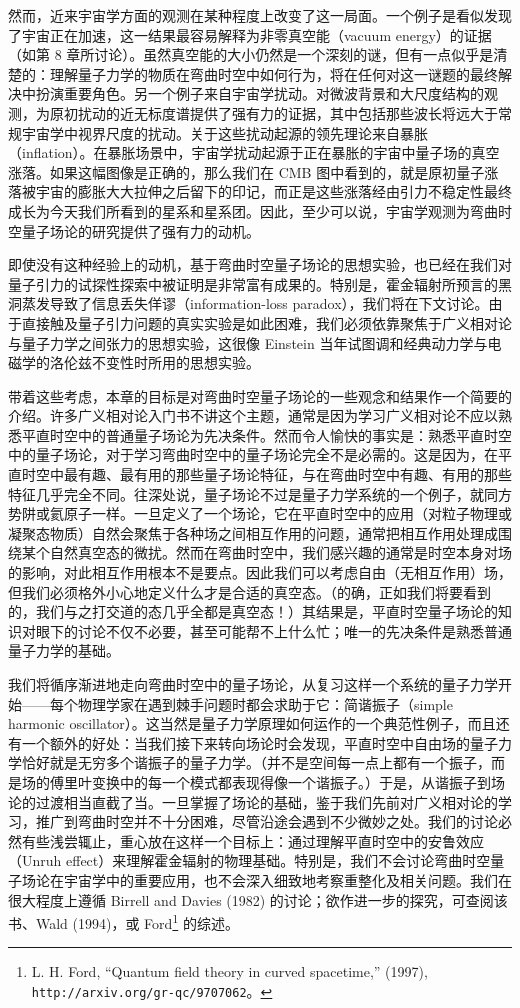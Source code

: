 然而，近来宇宙学方面的观测在某种程度上改变了这一局面。一个例子是看似发现了宇宙正在加速，这一结果最容易解释为非零真空能（vacuum energy）的证据（如第 8 章所讨论）。虽然真空能的大小仍然是一个深刻的谜，但有一点似乎是清楚的：理解量子力学的物质在弯曲时空中如何行为，将在任何对这一谜题的最终解决中扮演重要角色。另一个例子来自宇宙学扰动。对微波背景和大尺度结构的观测，为原初扰动的近无标度谱提供了强有力的证据，其中包括那些波长将远大于常规宇宙学中视界尺度的扰动。关于这些扰动起源的领先理论来自暴胀（inflation）。在暴胀场景中，宇宙学扰动起源于正在暴胀的宇宙中量子场的真空涨落。如果这幅图像是正确的，那么我们在 CMB 图中看到的，就是原初量子涨落被宇宙的膨胀大大拉伸之后留下的印记，而正是这些涨落经由引力不稳定性最终成长为今天我们所看到的星系和星系团。因此，至少可以说，宇宙学观测为弯曲时空量子场论的研究提供了强有力的动机。

即使没有这种经验上的动机，基于弯曲时空量子场论的思想实验，也已经在我们对量子引力的试探性探索中被证明是非常富有成果的。特别是，霍金辐射所预言的黑洞蒸发导致了信息丢失佯谬（information-loss paradox），我们将在下文讨论。由于直接触及量子引力问题的真实实验是如此困难，我们必须依靠聚焦于广义相对论与量子力学之间张力的思想实验，这很像 Einstein 当年试图调和经典动力学与电磁学的洛伦兹不变性时所用的思想实验。

带着这些考虑，本章的目标是对弯曲时空量子场论的一些观念和结果作一个简要的介绍。许多广义相对论入门书不讲这个主题，通常是因为学习广义相对论不应以熟悉平直时空中的普通量子场论为先决条件。然而令人愉快的事实是：熟悉平直时空中的量子场论，对于学习弯曲时空中的量子场论完全不是必需的。这是因为，在平直时空中最有趣、最有用的那些量子场论特征，与在弯曲时空中有趣、有用的那些特征几乎完全不同。往深处说，量子场论不过是量子力学系统的一个例子，就同方势阱或氦原子一样。一旦定义了一个场论，它在平直时空中的应用（对粒子物理或凝聚态物质）自然会聚焦于各种场之间相互作用的问题，通常把相互作用处理成围绕某个自然真空态的微扰。然而在弯曲时空中，我们感兴趣的通常是时空本身对场的影响，对此相互作用根本不是要点。因此我们可以考虑自由（无相互作用）场，但我们必须格外小心地定义什么才是合适的真空态。（的确，正如我们将要看到的，我们与之打交道的态几乎全都是真空态！）其结果是，平直时空量子场论的知识对眼下的讨论不仅不必要，甚至可能帮不上什么忙；唯一的先决条件是熟悉普通量子力学的基础。

我们将循序渐进地走向弯曲时空中的量子场论，从复习这样一个系统的量子力学开始——每个物理学家在遇到棘手问题时都会求助于它：简谐振子（simple harmonic oscillator）。这当然是量子力学原理如何运作的一个典范性例子，而且还有一个额外的好处：当我们接下来转向场论时会发现，平直时空中自由场的量子力学恰好就是无穷多个谐振子的量子力学。（并不是空间每一点上都有一个振子，而是场的傅里叶变换中的每一个模式都表现得像一个谐振子。）于是，从谐振子到场论的过渡相当直截了当。一旦掌握了场论的基础，鉴于我们先前对广义相对论的学习，推广到弯曲时空并不十分困难，尽管沿途会遇到不少微妙之处。我们的讨论必然有些浅尝辄止，重心放在这样一个目标上：通过理解平直时空中的安鲁效应（Unruh effect）来理解霍金辐射的物理基础。特别是，我们不会讨论弯曲时空量子场论在宇宙学中的重要应用，也不会深入细致地考察重整化及相关问题。我们在很大程度上遵循 Birrell and Davies (1982) 的讨论；欲作进一步的探究，可查阅该书、Wald (1994)，或 Ford\footnote{L. H. Ford, “Quantum field theory in curved spacetime,” (1997), \texttt{http://arxiv.org/gr-qc/9707062}。} 的综述。

